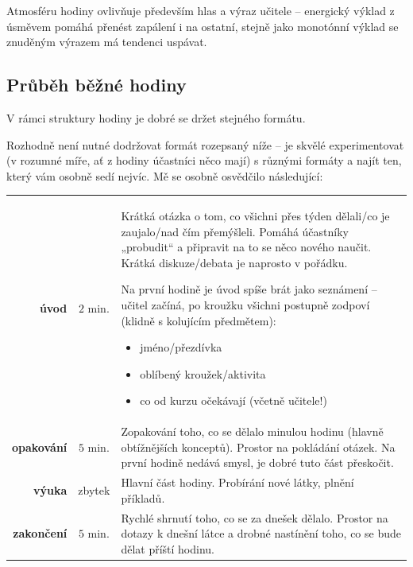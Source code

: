 Atmosféru hodiny ovlivňuje především hlas a výraz učitele -- energický výklad z úsměvem pomáhá přenést zapálení i na ostatní, stejně jako monotónní výklad se znuděným výrazem má tendenci uspávat.

\subsection{Průběh běžné hodiny}
V rámci struktury hodiny je dobré se držet stejného formátu.

Rozhodně není nutné dodržovat formát rozepsaný níže -- je skvělé experimentovat (v rozumné míře, ať z hodiny účastníci něco mají) s různými formáty a najít ten, který vám osobně sedí nejvíc. Mě se osobně osvědčilo následující:

\begin{table}[h!]
	\begin{tabularx}{\textwidth}{rc>{\setlength{\parskip}{0.5\baselineskip}}X} \toprule
		\textbf{úvod} & $2$ min. & Krátká otázka o tom, co všichni přes týden dělali/co je zaujalo/nad čím přemýšleli. Pomáhá účastníky „probudit“ a připravit na to se něco nového naučit. Krátká diskuze/debata je naprosto v pořádku.

		Na první hodině je úvod spíše brát jako seznámení -- učitel začíná, po kroužku všichni postupně zodpoví (klidně s kolujícím předmětem):
		\begin{itemize}[label=\textbullet, leftmargin=20pt,
							after*={\mbox{}\vspace{-\baselineskip}}]
			\item jméno/přezdívka
			\item oblíbený kroužek/aktivita
			\item co od kurzu očekávají (včetně učitele!)
		\end{itemize}
		\\
		\noalign{\vspace{8pt}}
		\textbf{opakování} & $5$ min. & Zopakování toho, co se dělalo minulou hodinu (hlavně obtížnějších konceptů). Prostor na pokládání otázek. Na první hodině nedává smysl, je dobré tuto část přeskočit. \\
		\noalign{\vspace{8pt}}
		\textbf{výuka} & zbytek &  Hlavní část hodiny. Probírání nové látky, plnění příkladů. \\
		\noalign{\vspace{8pt}}
		\textbf{zakončení} & $5$ min. & Rychlé shrnutí toho, co se za dnešek dělalo. Prostor na dotazy k dnešní látce a drobné nastínění toho, co se bude dělat příští hodinu. \\
		\bottomrule
	\end{tabularx}
\end{table}

